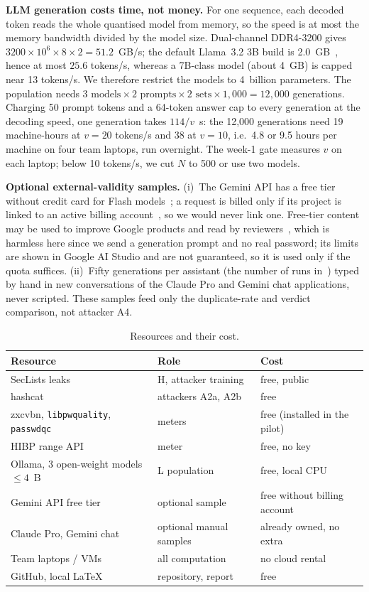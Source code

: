 \documentclass[conference]{IEEEtran}
\begin{document}
\textbf{LLM generation costs time, not money.} For one sequence, each decoded token reads the whole quantised model from memory, so the speed is at most the memory bandwidth divided by the model size. Dual-channel DDR4-3200 gives $3200\times10^6\times8\times2=51.2$~GB/s; the default Llama~3.2 3B build is 2.0~GB~\cite{ollama}, hence at most $25.6$ tokens/s, whereas a 7B-class model (about 4~GB) is capped near 13 tokens/s. We therefore restrict the models to 4~billion parameters. The population needs $3\text{ models}\times2\text{ prompts}\times2\text{ sets}\times1{,}000=12{,}000$ generations. Charging 50 prompt tokens and a 64-token answer cap to every generation at the decoding speed, one generation takes $114/v$~s: the 12{,}000 generations need 19 machine-hours at $v=20$ tokens/s and 38 at $v=10$, i.e.\ 4.8 or 9.5 hours per machine on four team laptops, run overnight. The week-1 gate measures $v$ on each laptop; below 10 tokens/s, we cut $N$ to 500 or use two models.

\textbf{Optional external-validity samples.} (i)~The Gemini API has a free tier without credit card for Flash models~\cite{geminipricing}; a request is billed only if its project is linked to an active billing account~\cite{geminiterms}, so we would never link one. Free-tier content may be used to improve Google products and read by reviewers~\cite{geminiterms}, which is harmless here since we send a generation prompt and no real password; its limits are shown in Google AI Studio and are not guaranteed, so it is used only if the quota suffices. (ii)~Fifty generations per assistant (the number of runs in~\cite{irregular2026}) typed by hand in new conversations of the Claude Pro and Gemini chat applications, never scripted. These samples feed only the duplicate-rate and verdict comparison, not attacker A4.

\begin{table}[t]
\centering
\caption{Resources and their cost.}
\label{tab:cost}
\footnotesize
\renewcommand{\arraystretch}{1.12}
\begin{tabularx}{\columnwidth}{@{}l Y Y@{}}
\toprule
\textbf{Resource} & \textbf{Role} & \textbf{Cost}\\
\midrule
SecLists leaks~\cite{seclists} & H, attacker training & free, public\\
hashcat~\cite{hashcat} & attackers A2a, A2b & free\\
zxcvbn, \texttt{libpwquality}, \texttt{passwdqc} & meters & free (installed in the pilot)\\
HIBP range API~\cite{hibp} & meter & free, no key\\
Ollama, 3 open-weight models $\le4$~B & L population & free, local CPU\\
Gemini API free tier & optional sample & free without billing account\\
Claude Pro, Gemini chat & optional manual samples & already owned, no extra\\
Team laptops / VMs & all computation & no cloud rental\\
GitHub, local \LaTeX & repository, report & free\\
\bottomrule
\end{tabularx}
\end{table}
\end{document}
